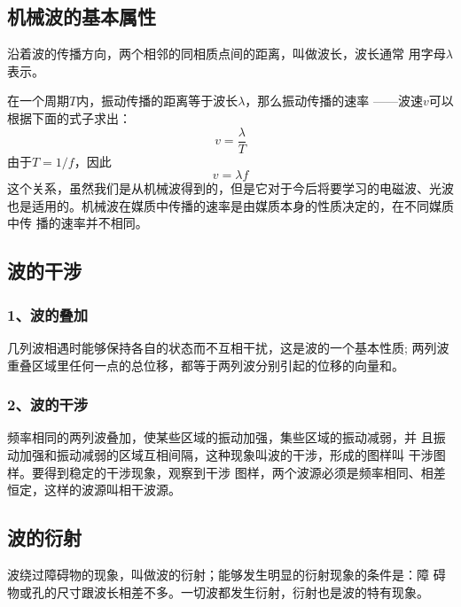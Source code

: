 \subsection{机械波的基本属性}
\begin{definition}
    沿着波的传播方向，两个相邻的同相质点间的距离，叫做波长，波长通常
    用字母$\lambda$表示。
\end{definition}

在一个周期$T$内，振动传播的距离等于波长$\lambda$，那么振动传播的速率
——波速$v$可以根据下面的式子求出：
\begin{equation}
    v=\frac{\lambda}{T}
\end{equation}
由于$T=1/f$，因此
\begin{equation}
    v=\lambda f
\end{equation}
这个关系，虽然我们是从机械波得到的，但是它对于今后将要学习的电磁波、光波
也是适用的。机械波在媒质中传播的速率是由媒质本身的性质决定的，在不同媒质中传
播的速率并不相同。
\subsection{波的干涉}
\subsubsection*{1、波的叠加}
\begin{theorem}
    几列波相遇时能够保持各自的状态而不互相干扰，这是波的一个基本性质;
    两列波重叠区域里任何一点的总位移，都等于两列波分别引起的位移的向量和。
\end{theorem}

\subsubsection*{2、波的干涉}
\begin{definition}
    频率相同的两列波叠加，使某些区域的振动加强，集些区域的振动减弱，并
    且振动加强和振动减弱的区域互相间隔，这种现象叫波的干涉，形成的图样叫
    干涉图样。要得到稳定的干涉现象，观察到干涉
    图样，两个波源必须是频率相同、相差恒定，这样的波源叫相干波源。
\end{definition}

\subsection{波的衍射}
\begin{definition}
    波绕过障碍物的现象，叫做波的衍射；能够发生明显的衍射现象的条件是：障
    碍物或孔的尺寸跟波长相差不多。一切波都发生衍射，衍射也是波的特有现象。
\end{definition}